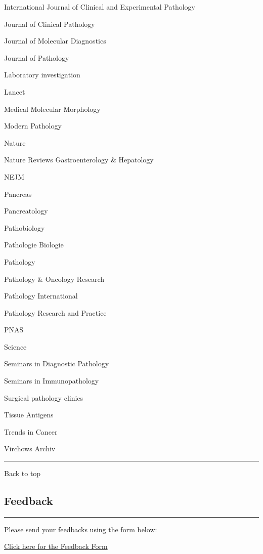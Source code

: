 \documentclass[]{article}
\begin{document}
International Journal of Clinical and Experimental Pathology

Journal of Clinical Pathology

Journal of Molecular Diagnostics

Journal of Pathology

Laboratory investigation

Lancet

Medical Molecular Morphology

Modern Pathology

Nature

Nature Reviews Gastroenterology \& Hepatology

NEJM

Pancreas

Pancreatology

Pathobiology

Pathologie Biologie

Pathology

Pathology \& Oncology Research

Pathology International

Pathology Research and Practice

PNAS

Science

Seminars in Diagnostic Pathology

Seminars in Immunopathology

Surgical pathology clinics

Tissue Antigens

Trends in Cancer

Virchows Archiv

\begin{center}\rule{0.5\linewidth}{\linethickness}\end{center}

Back to top

\pagebreak

\hypertarget{feedback}{%
\subsection{Feedback}\label{feedback}}

\begin{center}\rule{0.5\linewidth}{\linethickness}\end{center}

Please send your feedbacks using the form below:

\href{https://docs.google.com/forms/d/e/1FAIpQLSeD3Z9J6Y7eMmiyM12f_SfAmHUlykb1zxZcwO6lg7cebGYQIQ/viewform}{Click
here for the Feedback Form}
\end{document}
